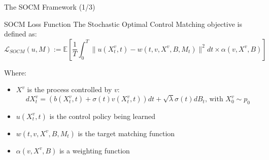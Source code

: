 \documentclass[aspectratio=169,xcolor=dvipsnames]{beamer}
\begin{document}
\begin{frame}{The SOCM Framework (1/3)}
    \small
    \begin{block}{SOCM Loss Function}
        The Stochastic Optimal Control Matching objective is defined as:
        \begin{equation}
        \mathcal{L}_{SOCM}(u, M) := \mathbb{E}\left[\frac{1}{T}\int_0^T \|u(X^v_t, t) - w(t, v, X^v, B, M_t)\|^2 dt \times \alpha(v, X^v, B)\right]
        \end{equation}
    \end{block}

    \begin{block}{Where:}
        \begin{itemize}
            \item $X^v$ is the process controlled by $v$: 
            \begin{equation}
            dX^v_t = (b(X^v_t, t) + \sigma(t)v(X^v_t, t)) dt + \sqrt{\lambda}\sigma(t) dB_t \text{, with } X^v_0 \sim p_0
            \end{equation} 
            \item $u(X^v_t, t)$ is the control policy being learned
            \item $w(t, v, X^v, B, M_t)$ is the target matching function
            \item $\alpha(v, X^v, B)$ is a weighting function
        \end{itemize}
    \end{block}
\end{frame}
\end{document}
